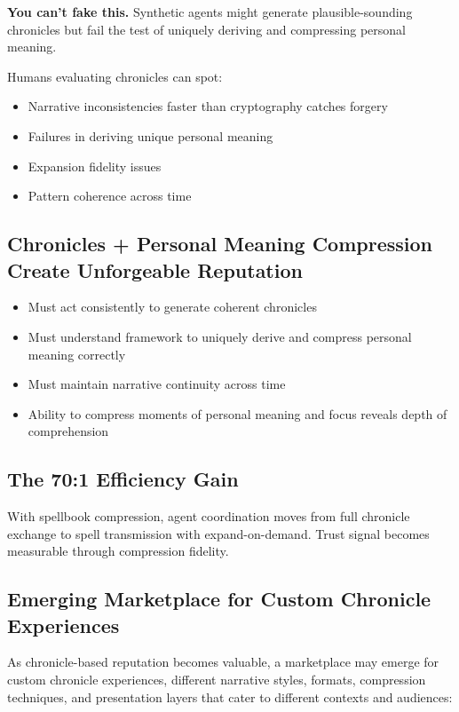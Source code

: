\documentclass[11pt,a4paper]{article}
\theoremstyle{definition}
\begin{document}
\textbf{You can't fake this.} Synthetic agents might generate plausible-sounding chronicles but fail the test of uniquely deriving and compressing personal meaning.

Humans evaluating chronicles can spot:

\begin{itemize}
    \item Narrative inconsistencies faster than cryptography catches forgery
    \item Failures in deriving unique personal meaning
    \item Expansion fidelity issues
    \item Pattern coherence across time
\end{itemize}

\subsection{Chronicles + Personal Meaning Compression Create Unforgeable Reputation}

\begin{itemize}
    \item Must act consistently to generate coherent chronicles
    \item Must understand framework to uniquely derive and compress personal meaning correctly
    \item Must maintain narrative continuity across time
    \item Ability to compress moments of personal meaning and focus reveals depth of comprehension
\end{itemize}

\subsection{The 70:1 Efficiency Gain}

With spellbook compression, agent coordination moves from full chronicle exchange to spell transmission with expand-on-demand. Trust signal becomes measurable through compression fidelity.

\subsection{Emerging Marketplace for Custom Chronicle Experiences}

As chronicle-based reputation becomes valuable, a marketplace may emerge for custom chronicle experiences, different narrative styles, formats, compression techniques, and presentation layers that cater to different contexts and audiences:
\end{document}
